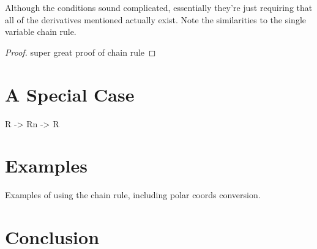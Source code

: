 \documentclass{ximera}
\begin{document}
 Although the conditions sound complicated, essentially they're just requiring that all of the derivatives mentioned actually exist. Note the similarities to the single variable chain rule.
 
\begin{proof}
super great proof of chain rule
\end{proof}

\section{A Special Case}

R -> Rn -> R


\section{Examples}

Examples of using the chain rule, including polar coords conversion.

\section{Conclusion}
\end{document}
